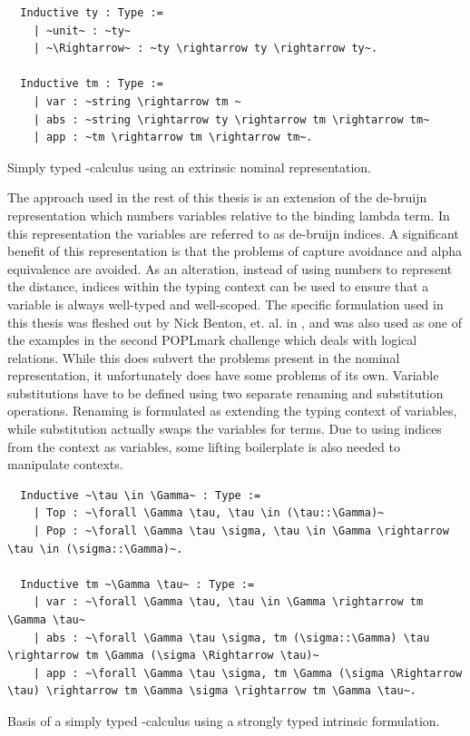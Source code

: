 \documentclass[12pt, final]{article}
\begin{document}
\begin{listing}[h]
  \begin{verbatim}
  Inductive ty : Type :=
    | ~unit~ : ~ty~
    | ~\Rightarrow~ : ~ty \rightarrow ty \rightarrow ty~.

  Inductive tm : Type :=
    | var : ~string \rightarrow tm ~
    | abs : ~string \rightarrow ty \rightarrow tm \rightarrow tm~
    | app : ~tm \rightarrow tm \rightarrow tm~.
  \end{verbatim}
  \caption{Simply typed \lambda-calculus using an extrinsic nominal representation.}
  \label{lst:nominal_stlc}
\end{listing}

The approach used in the rest of this thesis is an extension of the de-bruijn representation which numbers variables relative to the binding lambda term.
In this representation the variables are referred to as de-bruijn indices.
A significant benefit of this representation is that the problems of capture avoidance and alpha equivalence are avoided.
As an alteration, instead of using numbers to represent the distance, indices within the typing context can be used to ensure that a variable is always well-typed and well-scoped.
The specific formulation used in this thesis was fleshed out by Nick Benton, et. al. in \cite{Benton2011}, and was also used as one of the examples in the second POPLmark challenge which deals with logical relations\cite{poplmark_reloaded}.
While this does subvert the problems present in the nominal representation, it unfortunately does have some problems of its own.
Variable substitutions have to be defined using two separate renaming and substitution operations.
Renaming is formulated as extending the typing context of variables, while substitution actually swaps the variables for terms.
Due to using indices from the context as variables, some lifting boilerplate is also needed to manipulate contexts.

\begin{listing}[h]
  \begin{verbatim}
  Inductive ~\tau \in \Gamma~ : Type :=
    | Top : ~\forall \Gamma \tau, \tau \in (\tau::\Gamma)~
    | Pop : ~\forall \Gamma \tau \sigma, \tau \in \Gamma \rightarrow \tau \in (\sigma::\Gamma)~.

  Inductive tm ~\Gamma \tau~ : Type :=
    | var : ~\forall \Gamma \tau, \tau \in \Gamma \rightarrow tm \Gamma \tau~
    | abs : ~\forall \Gamma \tau \sigma, tm (\sigma::\Gamma) \tau \rightarrow tm \Gamma (\sigma \Rightarrow \tau)~
    | app : ~\forall \Gamma \tau \sigma, tm \Gamma (\sigma \Rightarrow \tau) \rightarrow tm \Gamma \sigma \rightarrow tm \Gamma \tau~.
  \end{verbatim}
  \caption{Basis of a simply typed \lambda-calculus using a strongly typed intrinsic formulation.}
  \label{lst:strong_stlc}
\end{listing}
\end{document}
